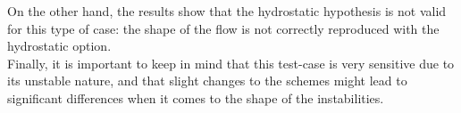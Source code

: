 On the other hand, the results show that the hydrostatic hypothesis is not valid
for this type of case:
the shape of the flow is not correctly reproduced with the hydrostatic option.\\

Finally, it is important to keep in mind that this test-case is
very sensitive due to its unstable nature, and that slight changes to the schemes
might lead to significant differences when it comes to the shape of the instabilities.
